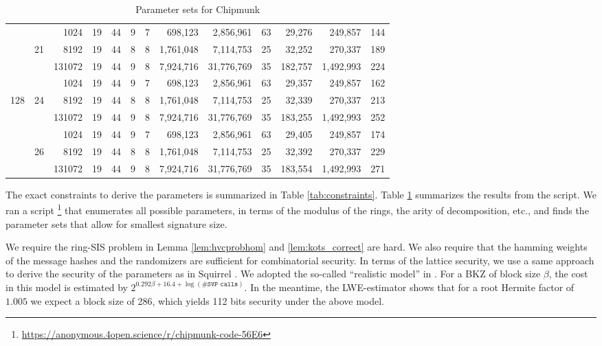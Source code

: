 \begin{table}
\begin{tabular}{|c|c|r||c|c||c|c|r|r||c||r|r||c|}
    &       &   1024 &         19 &        44 &          9 &       7 &        698,123 &  2,856,961 &    63 &       29,276 &   249,857 & 144 \\\cline{3-13}
    &    21 &   8192 &         19 &        44 &          8 &       8 &      1,761,048 &  7,114,753 &    25 &       32,252 &   270,337 & 189 \\\cline{3-13}
    &       & 131072 &         19 &        44 &          9 &       8 &      7,924,716 & 31,776,769 &    35 &      182,757 & 1,492,993 & 224 \\\cline{2-13}

    &       &   1024 &         19 &        44 &          9 &       7 &        698,123 &  2,856,961 &    63 &       29,357 &   249,857 & 162 \\\cline{3-13}
128 &    24 &   8192 &         19 &        44 &          8 &       8 &      1,761,048 &  7,114,753 &    25 &       32,339 &   270,337 & 213 \\\cline{3-13}
    &       & 131072 &         19 &        44 &          9 &       8 &      7,924,716 & 31,776,769 &    35 &      183,255 & 1,492,993 & 252 \\\cline{2-13}

    &       &   1024 &         19 &        44 &          9 &       7 &        698,123 &  2,856,961 &    63 &       29,405 &   249,857 & 174 \\\cline{3-13}
    &    26 &   8192 &         19 &        44 &          8 &       8 &      1,761,048 &  7,114,753 &    25 &       32,392 &   270,337 & 229 \\\cline{3-13}
    &       & 131072 &         19 &        44 &          9 &       8 &      7,924,716 & 31,776,769 &    35 &      183,554 & 1,492,993 & 271 \\\hline
  \end{tabular}\label{tab:param}
  \caption{Parameter sets for Chipmunk}
\end{table}

The exact constraints to derive the parameters is summarized in Table \ref{tab:constraints}.
Table \ref{tab:param} summarizes the results from the script. 
We ran a script \footnote{\label{fn:github}\url{https://anonymous.4open.science/r/chipmunk-code-56E6}}
that enumerates all possible 
parameters, in terms of the modulus of the rings, the arity of decomposition, etc., and finds the parameter sets that
allow for smallest signature size.

We require the ring-SIS problem in Lemma \ref{lem:hvcprobhom} and \ref{lem:kots_correct} are hard. 
We also require that the hamming weights of the message hashes and the randomizers are sufficient for combinatorial security.
In terms of the lattice security, we use a same approach to derive the security of the parameters as in Squirrel \cite{CCS:FleSimZha22}.
We adopted the so-called ``realistic model'' in \cite{DBLP:conf/uss/AlkimDPS16}.
For a BKZ of block size $\beta$, the cost in this model is estimated by
$2^{0.292\beta+16.4+\log(\#\texttt{SVP calls})}$. 
In the meantime, the LWE-estimator \cite{DBLP:journals/jmc/AlbrechtPS15}
shows that for a root Hermite factor of $1.005$ we expect a block size of 286, which yields 112 bits security under the above model. 


